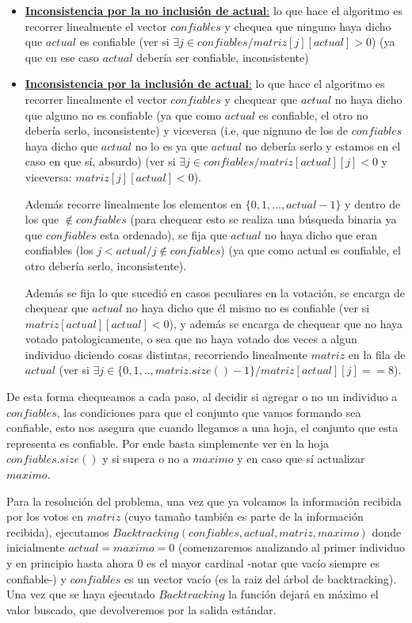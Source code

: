 \documentclass[A4paper,oneside,fleqn,10pt]{article}
\theoremstyle{definition}
\begin{document}
\begin{itemize}
\item \underline{\textbf{Inconsistencia por la no inclusión de actual}:} lo que hace el algoritmo es recorrer linealmente el vector $confiables$ y chequea que ninguno haya dicho que $actual$ es confiable (ver si $ \exists j \in confiables / matriz[j][actual]>0$) (ya que en ese caso $actual$ debería ser confiable, inconsistente)
\item  \underline{\textbf{Inconsistencia por la inclusión de actual}:} lo que hace el algoritmo es recorrer linealmente el vector $confiables$ y chequear que $actual$ no haya dicho que alguno no es confiable (ya que como $actual$ es confiable, el otro no debería serlo, inconsistente) y viceversa (i.e, que nignuno de los de $confiables$ haya dicho que $actual$ no lo es ya que  $actual$ no debería serlo y estamos en el caso en que sí, absurdo) (ver si $ \exists j \in confiables / matriz[actual][j]<0$ y viceversa: $matriz[j][actual]<0 $). 

Además recorre linealmente los elementos en $\{0,1,...,actual-1\}$ y dentro de los que $\notin confiables$ (para chequear esto se realiza una búsqueda binaria ya que $confiables$ esta ordenado), se fija que $actual$ no haya dicho que eran confiables (los $j<actual / j \notin confiables$) (ya que como actual es confiable, el otro debería serlo, inconsistente).
 
Además se fija lo que sucedió en casos peculiares en la votación, se encarga de chequear que $actual$ no haya dicho que él mismo no es confiable (ver si $matriz[actual][actual]<0$), y además se encarga de chequear que no haya votado patologicamente, o sea que no haya votado dos veces a algun individuo diciendo cosas distintas, recorriendo linealmente $matriz$ en la fila de $actual$ (ver si $ \exists j \in \{0,1,..,matriz.size()-1\} / matriz[actual][j]==8$). 
\end{itemize}

De esta forma chequeamos a cada paso, al decidir si agregar o no un individuo a $confiables$, las condiciones para que el conjunto que vamos formando sea confiable, esto nos asegura que cuando llegamos a una hoja, el conjunto que esta representa es confiable. Por ende basta simplemente ver en la hoja $confiables.size()$ y si supera o no a $maximo$ y en caso que sí actualizar $maximo$.

Para la resolución del problema, una vez que ya volcamos la información recibida por los votos en $matriz$ (cuyo tamaño también es parte de la información recibida), ejecutamos $Backtracking(confiables, actual, matriz, maximo)$ donde inicialmente $actual=maximo=0$ (comenzaremos analizando al primer individuo y en principio hasta ahora $0$ es el mayor cardinal -notar que vacío siempre es confiable-) y $confiables$ es un vector vacío (es la raiz del árbol de backtracking). Una vez que se haya ejecutado $Backtracking$ la función dejará en máximo el valor buscado, que devolveremos por la salida estándar.
\end{document}
